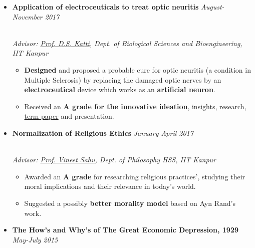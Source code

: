 \documentclass{article}
\begin{document}
\vspace{-2mm}


\begin{itemize}

\item \textbf{Application of electroceuticals to treat optic neuritis}
     \hfill\textit{August-November 2017}
     
     \vspace{-1mm}
     
     \\[3pt] \textit{\small Advisor: \href{https://www.iitk.ac.in/new/dhirendra-s-katti}{Prof. D.S. Katti}, Dept. of Biological Sciences and Bioengineering, IIT Kanpur  }  
    \begin{itemize}
        \item \textbf{Designed} and proposed a probable cure for optic neuritis (a condition in Multiple Sclerosis) by replacing the damaged optic nerves by an \textbf{electroceutical} device which works as an \textbf{artificial neuron}. 
        \item Received an \textbf{A grade for the innovative ideation}, insights, research, \href{https://github.com/aman161upadhyay/Projects-Term-Papers/blob/master/Biomaterial_Term%20Paper_OpticNeuritis.pdf}{ term paper} and presentation. 
    \end{itemize}
    
  
    
    \item \textbf{Normalization of Religious Ethics}
     \hfill\textit{January-April 2017}
     \vspace{-1mm}
     
     \\[3pt]  \textit{\small Advisor: \href{http://home.iitk.ac.in/~vineet/}{Prof. Vineet Sahu}, Dept. of Philosophy HSS,
     IIT Kanpur  }
    \begin{itemize}
        \item Awarded an \textbf{A grade} for researching religious practices', studying their moral implications and their relevance in today's world.
        \item Suggested a possibly \textbf{better morality model} based on Ayn Rand's work. 
    \end{itemize}
    
    \item \textbf{The How’s and Why’s of The Great Economic Depression, 1929}   \hfill\textit{May-July 2015} \\
    

\end{itemize}
\end{document}
